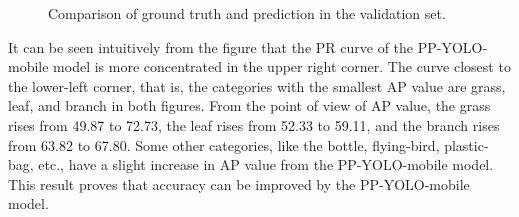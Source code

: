 \documentclass[sensors,article,submit,moreauthors,pdftex]{Definitions/mdpi}
\begin{document}
\begin{paracol}{2}
\begin{figure}[H]
\centering
{}
\quad
{}
\caption{Comparison of ground truth and prediction in the validation set.}
\label{fig:prc}
\end{figure}

It can be seen intuitively from the figure that the PR curve of the PP-YOLO-mobile model is more concentrated in the upper right corner. 
The curve closest to the lower-left corner, that is, the categories with the smallest AP value are grass, leaf, and branch in both figures.
From the point of view of AP value, the grass rises from 49.87 to 72.73, the leaf rises from 52.33 to 59.11, and the branch rises from 63.82 to 67.80. Some other categories, like the bottle, flying-bird, plastic-bag, etc., have a slight increase in AP value from the PP-YOLO-mobile model. This result proves that accuracy can be improved by the PP-YOLO-mobile model.



\end{paracol}
\end{document}
